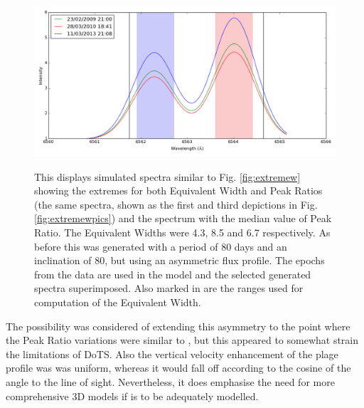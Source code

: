 \begin{figure}[!htbp]
\begin{center}
\includegraphics[scale=0.40]{Figures/extremeasym.png} \\
\end{center}
\caption{This displays simulated spectra similar to Fig. \ref{fig:extremew} showing the extremes for both Equivalent
  Width and Peak Ratios (the same spectra, shown as the first and third depictions in Fig. \ref{fig:extremewpics}) and
  the spectrum with the median value of Peak Ratio. The Equivalent Widths were 4.3, 8.5 and 6.7 respectively. As before
  this was generated with a period of 80 days and an inclination of 80\degree, but using an asymmetric flux profile. The
  epochs from the {\harps} data are used in the model and the selected generated spectra superimposed. Also marked in
  are the ranges used for computation of the Equivalent Width.}
\protect\label{fig:extremeasym}
\end{figure}

The possibility was considered of extending this asymmetry to the point where the Peak Ratio variations were similar to
\harps, but this appeared to somewhat strain the limitations of DoTS. Also the vertical velocity enhancement of the
plage profile was was uniform, whereas it would fall off according to the cosine of the angle to the line of
sight. Nevertheless, it does emphasise the need for more comprehensive 3D models if {\prox} is to be adequately
modelled.
